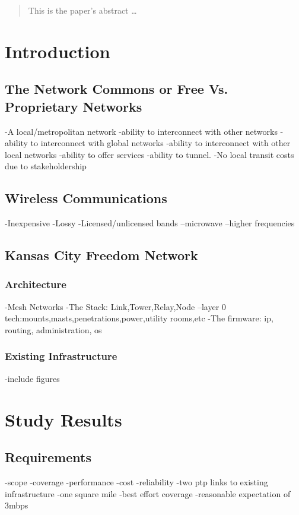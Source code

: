 \documentclass[12pt]{article}
\begin{document}
\maketitle

\begin{abstract}
This is the paper's abstract \ldots
\end{abstract}

\section{Introduction}\label{Introduction}
\subsection{The Network Commons or Free Vs. Proprietary Networks}
-A local/metropolitan network
-ability to interconnect with other networks
-ability to interconnect with global networks
-ability to interconnect with other local networks
-ability to offer services
-ability to tunnel.
-No local transit costs due to stakeholdership

\subsection{Wireless Communications}
-Inexpensive
-Lossy
-Licensed/unlicensed bands
--microwave
--higher frequencies


\subsection{Kansas City Freedom Network}\label{KCFN}
\subsubsection{Architecture}
-Mesh Networks
-The Stack: Link,Tower,Relay,Node
--layer 0 tech:mounts,masts,penetrations,power,utility rooms,etc
-The firmware: ip, routing, administration, os

\subsubsection{Existing Infrastructure}
-include figures

\section{Study Results}\label{LPA}
\subsection{Requirements}
-scope -coverage -performance -cost -reliability
-two ptp links to existing infrastructure
-one square mile
-best effort coverage
-reasonable expectation of 3mbps
\end{document}

